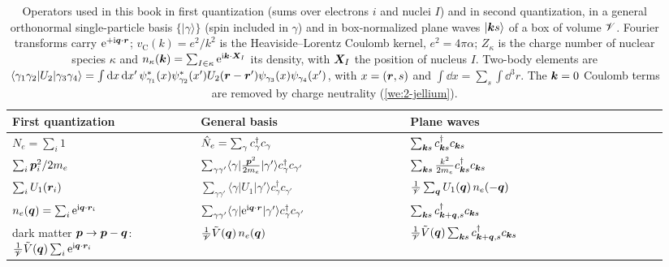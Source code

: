 \begin{table}[tbp]
  \centering
  \small
  \caption{Operators used in this book in first quantization (sums over electrons $i$ and nuclei $I$) and in second quantization, in a general orthonormal single-particle basis $\{|\gamma\rangle\}$ (spin included in $\gamma$) and in box-normalized plane waves $|\bm{k}s\rangle$ of a box of volume $\mathscr{V}$. Fourier transforms carry $\mathrm{e}^{+\mathrm{i}\bm{q}\cdot\bm{r}}$; $v_{\mathrm{C}}(k) = e^2/k^2$ is the Heaviside--Lorentz Coulomb kernel, $e^2 = 4\pi\alpha$; $Z_\kappa$ is the charge number of nuclear species $\kappa$ and $n_\kappa(\bm{k}) = \sum_{I\in\kappa}\mathrm{e}^{\mathrm{i}\bm{k}\cdot\bm{X}_I}$ its density, with $\bm{X}_I$ the position of nucleus $I$. Two-body elements are $\langle\gamma_1\gamma_2|U_2|\gamma_3\gamma_4\rangle = \int\mathrm{d} x\,\mathrm{d} x'\,\psi^*_{\gamma_1}(x)\psi^*_{\gamma_2}(x')U_2(\bm{r} - \bm{r}')\psi_{\gamma_3}(x)\psi_{\gamma_4}(x')$, with $x = (\bm{r}, s)$ and $\int\dd x = \sum_s\int\dd^3r$. The $\bm{k} = 0$ Coulomb terms are removed by charge neutrality (\cref{we:2-jellium}).}
  \label{tab:2-operators}
  \renewcommand{\arraystretch}{1.5}
  \begin{tabular}{@{}p{0.27\linewidth}p{0.30\linewidth}p{0.37\linewidth}@{}}
    \toprule
    First quantization & General basis & Plane waves \\
    \midrule
    $N_e = \sum_i 1$ & $\hat{N}_e = \sum_\gamma c^\dagger_\gamma c_\gamma$ & $\sum_{\bm{k}s}c^\dagger_{\bm{k}s}c_{\bm{k}s}$ \\
    $\sum_i\bm{p}_i^2/2m_e$ & $\sum_{\gamma\gamma'}\langle\gamma|\tfrac{\bm{p}^2}{2m_e}|\gamma'\rangle c^\dagger_\gamma c_{\gamma'}$ & $\sum_{\bm{k}s}\tfrac{k^2}{2m_e}c^\dagger_{\bm{k}s}c_{\bm{k}s}$ \\
    $\sum_iU_1(\bm{r}_i)$ & $\sum_{\gamma\gamma'}\langle\gamma|U_1|\gamma'\rangle c^\dagger_\gamma c_{\gamma'}$ & $\tfrac1{\mathscr{V}}\sum_{\bm{q}}U_1(\bm{q})\,n_e(-\bm{q})$ \\
    $n_e(\bm{q}) = \sum_i\mathrm{e}^{\mathrm{i}\bm{q}\cdot\bm{r}_i}$ & $\sum_{\gamma\gamma'}\langle\gamma|\mathrm{e}^{\mathrm{i}\bm{q}\cdot\bm{r}}|\gamma'\rangle c^\dagger_\gamma c_{\gamma'}$ & $\sum_{\bm{k}s}c^\dagger_{\bm{k}+\bm{q},s}c_{\bm{k}s}$ \\
    dark matter $\bm{p} \to \bm{p} - \bm{q}$: $\tfrac1{\mathscr{V}}\tilde V(\bm{q})\sum_i\mathrm{e}^{\mathrm{i}\bm{q}\cdot\bm{r}_i}$ & $\tfrac1{\mathscr{V}}\tilde V(\bm{q})\,n_e(\bm{q})$ & $\tfrac1{\mathscr{V}}\tilde V(\bm{q})\sum_{\bm{k}s}c^\dagger_{\bm{k}+\bm{q},s}c_{\bm{k}s}$ \\

\end{tabular}
\end{table}
